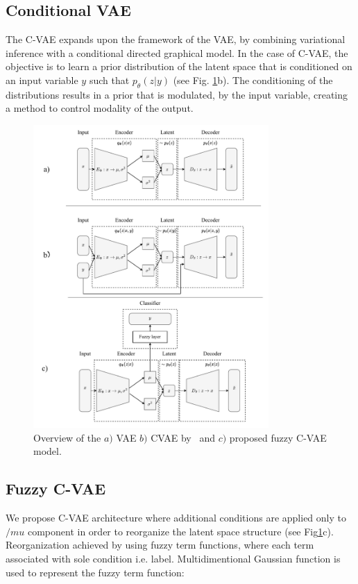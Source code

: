 \documentclass[runningheads]{llncs}
\begin{document}
\subsection{Conditional VAE}
The C-VAE expands upon the framework of the VAE, by combining variational inference with a conditional directed graphical model. 
In the case of C-VAE, the objective is to learn a prior distribution of the latent space that is conditioned on an input variable $y$ such that $p_\theta (z|y)$ (see Fig. \ref{fig:overview}b).
The conditioning of the distributions results in a prior that is modulated, by the input variable, creating a method to control modality of the output. 

\begin{figure}[h]  
    \centering
    \includegraphics[width=0.8\textwidth]{fig_1.pdf}
    \caption{Overview of the $a)$ VAE $b)$ CVAE by~\cite{SohnCVAE} and $c)$ proposed fuzzy C-VAE model.}
    \label{fig:overview}
\end{figure}

\subsection{Fuzzy C-VAE}

We propose C-VAE architecture where additional conditions are applied only to $/mu$ component in order to reorganize the latent space structure (see Fig\ref{fig:overview}c).
Reorganization achieved by using fuzzy term functions, where each term associated with sole condition i.e. label.
Multidimentional Gaussian function is used to represent the fuzzy term function:
\end{document}
